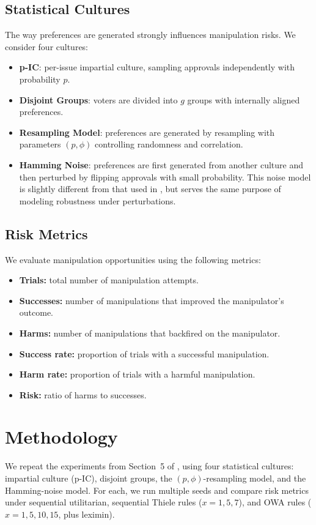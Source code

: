 \documentclass[11pt]{article}
\begin{document}
\subsection{Statistical Cultures}
The way preferences are generated strongly influences manipulation risks.
We consider four cultures:
\begin{itemize}
    \item \textbf{p-IC}: per-issue impartial culture, sampling approvals
    independently with probability $p$.
    \item \textbf{Disjoint Groups}: voters are divided into $g$ groups with
    internally aligned preferences.
    \item \textbf{Resampling Model}: preferences are generated by resampling
    with parameters $(p, \phi)$ controlling randomness and correlation.
    \item \textbf{Hamming Noise}: preferences are first generated from another
    culture and then perturbed by flipping approvals with small probability.
    This noise model is slightly different from that used in
    \cite{lackner2023freeriding}, but serves the same purpose of modeling
    robustness under perturbations.
\end{itemize}

\subsection{Risk Metrics}
We evaluate manipulation opportunities using the following metrics:
\begin{itemize}
    \item \textbf{Trials:} total number of manipulation attempts.  
    \item \textbf{Successes:} number of manipulations that improved the manipulator’s outcome.  
    \item \textbf{Harms:} number of manipulations that backfired on the manipulator.  
    \item \textbf{Success rate:} proportion of trials with a successful manipulation.  
    \item \textbf{Harm rate:} proportion of trials with a harmful manipulation.  
    \item \textbf{Risk:} ratio of harms to successes.  
\end{itemize}

\section{Methodology}
We repeat the experiments from Section~5 of \cite{lackner2023freeriding},
using four statistical cultures: impartial culture (p-IC), disjoint groups,
the $(p, \phi)$-resampling model, and the Hamming-noise model. For each, we run
multiple seeds and compare risk metrics under sequential utilitarian,
sequential Thiele rules ($x=1,5,7$), and OWA rules ($x=1,5,10,15$, plus leximin).
\end{document}
